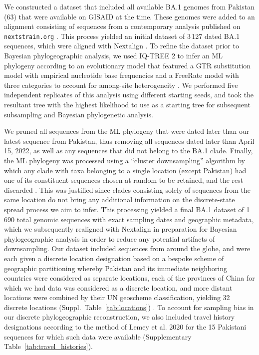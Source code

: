 We constructed a dataset that included all available BA.1 genomes from Pakistan (63) that were available on GISAID at the time.
These genomes were added to an alignment consisting of sequences from a contemporary analysis published on \verb|nextstrain.org| \cite{hadfield2018nextstrain}.
This process yielded an initial dataset of 3\,127 dated BA.1 sequences, which were aligned with Nextalign \cite{aksamentov2021nextclade}.
To refine the dataset prior to Bayesian phylogeographic analysis, we used IQ-TREE 2 \cite{minh2020iq} to infer an ML phylogeny according to an evolutionary model that featured a GTR substitution model with empirical nucleotide base frequencies and a FreeRate model with three categories to account for among-site heterogeneity \cite{yang1995space, soubrier2012influence}. We performed five independent replicates of this analysis using different starting seeds, and took the resultant tree with the highest likelihood to use as a starting tree for subsequent subsampling and Bayesian phylogenetic analysis.

We pruned all sequences from the ML phylogeny that were dated later than our latest sequence from Pakistan, thus removing all sequences dated later than April 15, 2022, as well as any sequences that did not belong to the BA.1 clade.
Finally, the ML phylogeny was processed using a ``cluster downsampling'' algorithm by which any clade with taxa belonging to a single location (except Pakistan) had one of its constituent sequences chosen at random to be retained, and the rest discarded \cite{hong2020search}.
This was justified since clades consisting solely of sequences from the same location do not bring any additional information on the discrete-state spread process we aim to infer.
This processing yielded a final BA.1 dataset of 1\,690 total genomic sequences with exact sampling dates and geographic metadata, which we subsequently realigned with Nextalign in preparation for Bayesian phylogeographic analysis in order to reduce any potential artifacts of downsampling.
Our dataset included sequences from around the globe, and were each given a discrete location designation based on a bespoke scheme of geographic partitioning whereby Pakistan and its immediate neighboring countries were considered as separate locations, each of the provinces of China for which we had data was considered as a discrete location, and more distant locations were combined by their UN geoscheme classification, yielding 32 discrete locations (Suppl.~Table~\ref{tab:locations}) \cite{unUNSDx2014}.
To account for sampling bias in our discrete phylogeographic reconstruction, we also included travel history designations according to the method of Lemey et al. 2020 \cite{lemey2020accommodating} for the 15 Pakistani sequences for which such data were available (Supplementary Table~\ref{tab:travel_histories}).


